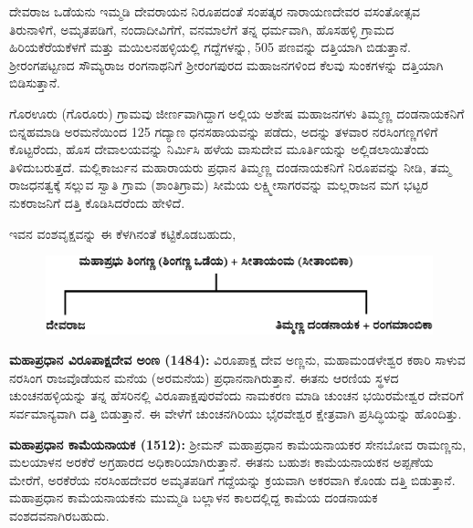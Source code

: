 ದೇವರಾಜ ಒಡೆಯನು ಇಮ್ಮಡಿ ದೇವರಾಯನ ನಿರೂಪದಂತೆ ಸಂಪತ್ಕರ ನಾರಾಯಣದೇವರ ವಸಂತೋತ್ಸವ ತಿರುನಾಳಿಗೆ, ಅಮೃತಪಡಿಗೆ, ನಂದಾದೀವಿಗೆಗೆ, ವನಮಾಲೆಗೆ ತನ್ನ ಧರ್ಮವಾಗಿ, ಹೊಸಹಳ್ಳಿ ಗ್ರಾಮದ ಹಿರಿಯಕೆರೆಯಕೆಳಗೆ ಮತ್ತು ಮಯಿಲನಹಳ್ಳಿಯಲ್ಲಿ ಗದ್ದೆಗಳನ್ನು, 505 ಪಣವನ್ನು ದತ್ತಿಯಾಗಿ ಬಿಡುತ್ತಾನೆ. ಶ‍್ರೀರಂಗಪಟ್ಟಣದ ಸೌಮ್ಯರಾಜ ರಂಗನಾಥನಿಗೆ ಶ‍್ರೀರಂಗಪುರದ ಮಹಾಜನಗಳಿಂದ ಕೆಲವು ಸುಂಕಗಳನ್ನು ದತ್ತಿಯಾಗಿ ಬಿಡಿಸುತ್ತಾನೆ.

ಗೊರಊರು (ಗೊರೂರು) ಗ್ರಾಮವು ಜೀರ್ಣವಾಗಿದ್ದಾಗ ಅಲ್ಲಿಯ ಅಶೇಷ ಮಹಾಜನಗಳು ತಿಮ್ಮಣ್ಣ ದಂಡನಾಯಕ\-ನಿಗೆ ಬಿನ್ನಹಮಾಡಿ ಅರಮನೆಯಿಂದ 125 ಗದ್ಯಾಣ ಧನಸಹಾಯವನ್ನು ಪಡೆದು, ಅದನ್ನು ತಳವಾರ ನರಸಿಂಗಣ್ಣಗಳಿಗೆ ಕೊಟ್ಟರೆಂದು, ಹೊಸ ದೇವಾಲಯವನ್ನು ನಿರ್ಮಿಸಿ ಹಳೆಯ ವಾಸುದೇವ ಮೂರ್ತಿಯನ್ನು ಅಲ್ಲಿಡಲಾಯಿತೆಂದು ತಿಳಿದು\-ಬರುತ್ತದೆ. ಮಲ್ಲಿಕಾರ್ಜುನ ಮಹಾರಾಯರು ಪ್ರಧಾನ ತಿಮ್ಮಣ್ಣ ದಂಡನಾಯಕನಿಗೆ ನಿರೂಪವನ್ನು ನೀಡಿ, ತಮ್ಮ ರಾಜಧನತ್ವಕ್ಕೆ ಸಲ್ಲುವ ಸ್ವಾತಿ ಗ್ರಾಮ (ಶಾಂತಿಗ್ರಾಮ) ಸೀಮೆಯ ಲಕ್ಷ್ಮೀಸಾಗರವನ್ನು ಮಲ್ಲರಾಜನ ಮಗ ಭಟ್ಟರ ನುಕರಾಜನಿಗೆ ದತ್ತಿ ಕೊಡಿಸಿದರೆಂದು ಹೇಳಿದೆ.

\newpage

ಇವನ ವಂಶವೃಕ್ಷವನ್ನು ಈ ಕೆಳಗಿನಂತೆ ಕಟ್ಟಿಕೊಡಬಹುದು,

\begin{figure}[H]
\includegraphics[scale=1.2]{images/chap3/chap3fig38.jpeg}
\end{figure}

\vskip -3pt

\textbf{ಮಹಾಪ್ರಧಾನ ವಿರೂಪಾಕ್ಷದೇವ ಅಂಣ (1484):} ವಿರೂಪಾಕ್ಷ ದೇವ ಅಣ್ಣನು, ಮಹಾಮಂಡಳೇಶ್ವರ ಕಠಾರಿ ಸಾಳುವ ನರಸಿಂಗ ರಾಜವೊಡೆಯನ ಮನೆಯ (ಅರಮನೆಯ) ಪ್ರಧಾನನಾಗಿರುತ್ತಾನೆ. ಈತನು ಆರಣಿಯ ಸ್ಥಳದ ಚುಂಚನಹಳ್ಳಿಯನ್ನು ತನ್ನ ಹೆಸರಿನಲ್ಲಿ ವಿರೂಪಾಕ್ಷಪುರವೆಂದು ನಾಮಕರಣ ಮಾಡಿ ಚುಂಚನ ಭಯಿರಮೇಶ್ವರ ದೇವರಿಗೆ ಸರ್ವಮಾನ್ಯವಾಗಿ ದತ್ತಿ ಬಿಡುತ್ತಾನೆ. ಈ ವೇಳೆಗೆ ಚುಂಚನಗಿರಿಯು ಭೈರವೇಶ್ವರ ಕ್ಷೇತ್ರವಾಗಿ ಪ್ರಸಿದ್ಧಿಯನ್ನು ಹೊಂದಿತ್ತು.

\vskip -1pt

\textbf{ಮಹಾಪ್ರಧಾನ ಕಾಮೆಯನಾಯಕ (1512):} ಶ‍್ರೀಮನ್​ ಮಹಾಪ್ರಧಾನ ಕಾಮೆಯನಾಯಕರ ಸೇನಬೋವ ರಾಮಣ್ಣನು, ಮಲಯಾಳನ ಅರಕೆರೆ ಅಗ್ರಹಾರದ ಅಧಿಕಾರಿಯಾಗಿರುತ್ತಾನೆ. ಈತನು ಬಹುಶಃ ಕಾಮೆಯನಾಯಕನ ಅಪ್ಪಣೆಯ ಮೇರೆಗೆ, ಅರಕೆರೆಯ ನರಸಿಂಹದೇವರ ಅಮೃತಪಡಿಗೆ ಗದ್ದೆಯನ್ನು ಕ್ರಯವಾಗಿ ಅಕರವಾಗಿ ಕೊಂಡು ದತ್ತಿ ಬಿಡುತ್ತಾನೆ. ಮಹಾಪ್ರಧಾನ ಕಾಮೆಯನಾಯಕನು ಮುಮ್ಮಡಿ ಬಲ್ಲಾಳನ ಕಾಲದಲ್ಲಿದ್ದ ಕಾಮೆಯ ದಂಡನಾಯಕ ವಂಶದವನಾಗಿರಬಹುದು.

